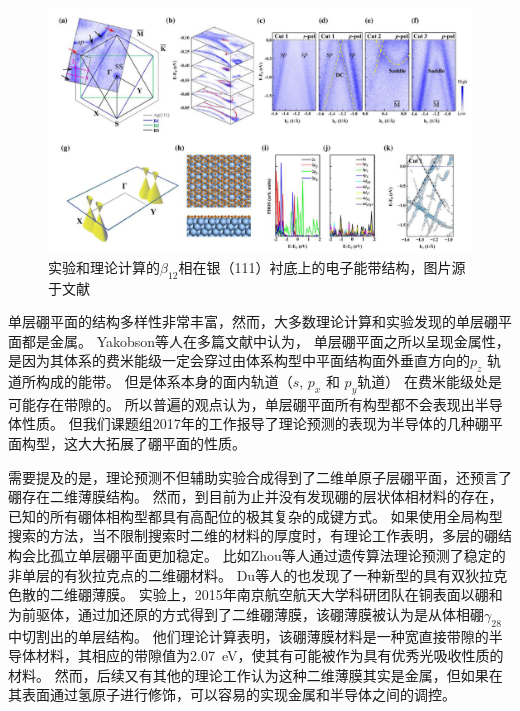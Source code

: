 \begin{figure}[htb]
  \includegraphics[width=1.0\textwidth]{figs/ch1_boron_arpes.png}
  \centering
  \caption{实验和理论计算的$\beta_{12}$相在银（111）衬底上的电子能带结构，图片源于文献\cite{feng2017dirac}}
  \label{fig:ch1_boron_arpes}
\end{figure}

单层硼平面的结构多样性非常丰富，然而，大多数理论计算和实验发现的单层硼平面都是金属\cite{zhang2017two}。
Yakobson等人\cite{penev2012polymorphism,penev2016can}在多篇文献中认为，
单层硼平面之所以呈现金属性，是因为其体系的费米能级一定会穿过由体系构型中平面结构面外垂直方向的$p_z$ 轨道所构成的能带。
但是体系本身的面内轨道（$s$, $p_x$ 和 $p_y$轨道） 在费米能级处是可能存在带隙的。
所以普遍的观点认为，单层硼平面所有构型都不会表现出半导体性质。
但我们课题组2017年的工作\cite{xu2017two}报导了理论预测的表现为半导体的几种硼平面构型，这大大拓展了硼平面的性质。

需要提及的是，理论预测不但辅助实验合成得到了二维单原子层硼平面，还预言了硼存在二维薄膜结构。
然而，到目前为止并没有发现硼的层状体相材料的存在，已知的所有硼体相构型都具有高配位的极其复杂的成键方式。
如果使用全局构型搜索的方法，当不限制搜索时二维的材料的厚度时，有理论工作表明，多层的硼结构会比孤立单层硼平面更加稳定。
比如Zhou等人\cite{zhou2014semimetallic}通过遗传算法理论预测了稳定的非单层的有狄拉克点的二维硼材料。
Du等人\cite{ma2016graphene}的也发现了一种新型的具有双狄拉克色散的二维硼薄膜。
实验上，2015年南京航空航天大学科研团队在铜表面以硼和为前驱体，通过加还原的方式得到了二维硼薄膜\cite{tai2015synthesis}，该硼薄膜被认为是从体相硼$\gamma_{28}$中切割出的单层结构。
他们理论计算表明，该硼薄膜材料是一种宽直接带隙的半导体材料，其相应的带隙值为\SI{2.07}{\eV}，使其有可能被作为具有优秀光吸收性质的材料。
然而，后续又有其他的理论工作\cite{kou2016high}认为这种二维薄膜其实是金属，但如果在其表面通过氢原子进行修饰，可以容易的实现金属和半导体之间的调控。

